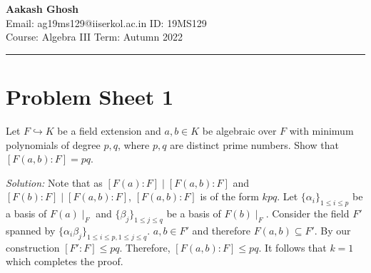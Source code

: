 \documentclass[a4paper, 11pt]{article}
\newenvironment{solution}
    {\textit{Solution:}}
    {}
\begin{document}
\noindent








\large\textbf{Aakash Ghosh} \hfill \textbf{}   \\
Email: ag19ms129@iiserkol.ac.in  \hfill ID: 19MS129 \\
\normalsize Course: Algebra III \hfill Term: Autumn 2022\\
\noindent\rule{7in}{2.8pt}
\section{Problem Sheet 1}
\begin{tcolorbox}[colback=c2,colframe=c1,title=Problem 1.5]
    Let $F \hookrightarrow K$ be a field extension and $a, b \in K$ be algebraic over $F$ with
    minimum polynomials of degree $p, q$, where $p, q$ are distinct prime numbers.
    Show that $[F(a, b) : F] = pq$.
\end{tcolorbox}
\begin{solution}
    Note that as $[F(a):F]\mid[F(a,b):F]$ and $[F(b):F]\mid[F(a,b):F]$, $[F(a,b):F]$ is of the form $kpq$. Let $\{\alpha_i\}_{1\leq i\leq p}$ be a basis of $F(a)\mid_F$ and $\{\beta_j\}_{1\leq j\leq q}$ be a basis of $F(b)\mid_F$. Consider the field $F'$ spanned by $\{\alpha_i\beta_j\}_{1\leq i\leq p,1\leq j\leq q}$. $a,b\in F'$ and therefore $F(a,b)\subseteq F'$. By our construction $[F':F]\leq pq$. Therefore, $[F(a,b):F]\leq pq$. It follows that $k=1$ which completes the proof.
\end{solution}
\end{document}
